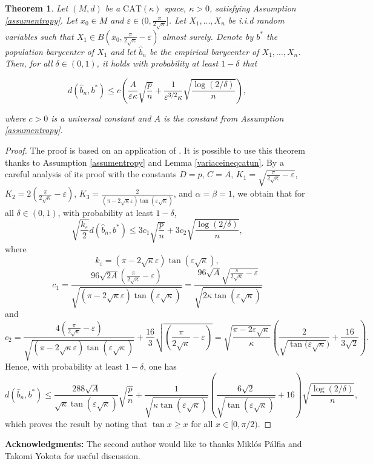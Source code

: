 \documentclass[10pt,a4paper]{article}
\theoremstyle{plain}
\newtheorem{theorem}{Theorem}[section]
\theoremstyle{definition}
\theoremstyle{remark}
\newcommand{\CAT}{\textrm{CAT}}
\begin{document}
\begin{theorem}\label{thmcatun}
    Let $(M,d)$ be a $\CAT(\kappa)$ space, $\kappa>0$, satisfying Assumption \ref{assumentropy}. Let $x_0\in M$ and $\varepsilon\in (0,\frac{\pi}{2\sqrt{\kappa}}]$. Let $X_1,...,X_n$ be i.i.d random variables such that $X_1\in B\left(x_0,\frac{\pi}{2\sqrt{\kappa}}-\varepsilon\right)$ almost surely. Denote by $b^*$ the population barycenter of $X_1$ and let $\hat b_n$ be the empirical barycenter of $X_1,\ldots,X_n$. Then, for all $\delta\in (0,1)$, it holds with probability at least $1-\delta$ that

    $$ d(\hat b_n,b^*) \leq c\left(\frac{A}{\varepsilon\kappa}\sqrt{\frac{p}{n}}+ \frac{1}{\varepsilon^{3/2}\kappa}\sqrt{\frac{\log(2/\delta)}{n}} \right),$$
    
    where $c>0$ is a universal constant and $A$ is the constant from Assumption \ref{assumentropy}.
\end{theorem}
\begin{proof}
The proof is based on an application of \cite[Theorem 2.1]{convrate}. It is possible to use this theorem thanks to Assumption \ref{assumentropy} and Lemma \ref{variaceineqcatun}. By a careful analysis of its proof with the constants $D=p $, $C=A$, $K_1=\sqrt{\frac{\pi}{2\sqrt{\kappa}}-\varepsilon}$, $K_2=2\left(\frac{\pi}{2\sqrt{\kappa}}-\varepsilon\right) $, $K_3=\frac{2}{(\pi-2\sqrt{\kappa}\varepsilon)\tan(\varepsilon\sqrt{\kappa})}$, and $\alpha=\beta=1 $, we obtain that for all $\delta\in(0,1)$, with probability at least $1-\delta$,
$$\sqrt{\frac{k_\varepsilon}{2}}d(\hat b_n,b^*) \leq 3c_1\sqrt{\frac{p}{n}} + 3c_2\sqrt{\frac{\log(2/\delta)}{n}},$$ where $$k_\varepsilon= (\pi-2\sqrt{\kappa}\varepsilon)\tan(\varepsilon\sqrt{\kappa}),$$ $$c_1=\frac{96\sqrt{2A}\left(\frac{\pi}{2\sqrt{\kappa}}-\varepsilon\right)}{\sqrt{(\pi-2\sqrt{\kappa}\varepsilon)\tan(\varepsilon\sqrt{\kappa})}} = \frac{96\sqrt A\sqrt{\frac{\pi}{2\sqrt\kappa}-\varepsilon}}{\sqrt{2\kappa\tan(\varepsilon\sqrt{\kappa})}}$$ and $$c_2 = \frac{4\left(\frac{\pi}{2\sqrt{\kappa}}-\varepsilon\right)}{\sqrt{(\pi-2\sqrt{\kappa}\varepsilon)\tan(\varepsilon\sqrt{\kappa})}} + \frac{16}{3}\sqrt{\left(\frac{\pi}{2\sqrt{\kappa}}-\varepsilon\right)} = \sqrt{\frac{\pi-2\varepsilon\sqrt{\kappa}}{\kappa}}\left( \frac{2}{\sqrt{\tan(\varepsilon\sqrt{\kappa}})}+\frac{16}{3\sqrt{2}}\right). $$
Hence, with probability at least $1-\delta$, one has
$$d(\hat b_n,b^*)\leq \frac{288 \sqrt A}{\sqrt{\kappa}\tan(\varepsilon\sqrt{\kappa})}\sqrt{\frac{p}{n}}+ \frac{1}{\sqrt{\kappa\tan(\varepsilon\sqrt{\kappa})}}\left( \frac{6\sqrt{2}}{\sqrt{\tan(\varepsilon\sqrt{\kappa})}}+16\right)\sqrt{\frac{\log(2/\delta)}{n}}, $$ which proves the result by noting that $\tan x\geq x$ for all $x\in [0,\pi/2)$. 
\end{proof} 

\textbf{Acknowledgments:} {The second author would like to thanks Miklós Pálfia and Takomi Yokota for useful discussion.}



%

\end{document}

